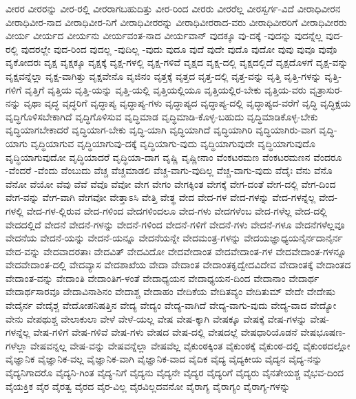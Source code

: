 {ವೀರರ
ವೀರರನ್ನು
ವೀರ-ರಲ್ಲಿ
ವೀರರಾಗಬಹುದಿತ್ತು
ವೀರ-ರಿಂದ
ವೀರರು
ವೀರರೆಲ್ಲ
ವೀರಸ್ವರ್ಗ-ವಿದೆ
ವೀರಾಧಿವೀರನ
ವೀರಾಧಿವೀರ-ನಾದ
ವೀರಾಧಿವೀರ-ನಿಗೆ
ವೀರಾಧಿವೀರರನ್ನು
ವೀರಾಧಿವೀರರಾದ-ವರು
ವೀರಾಧಿವೀರರಿಗೆ
ವೀರಾಧಿವೀರರು
ವೀರ್ಯ
ವೀರ್ಯದ
ವೀರ್ಯನು
ವೀರ್ಯವಂತ-ನಾದ
ವೀರ್ಯವಾನ್
ವುದಕ್ಕೂ
ವು-ದಕ್ಕೆ
-ವುದನ್ನು
ವುದನ್ನೆಲ್ಲ
ವುದ-ರಲ್ಲಿ
ವುದರಲ್ಲೇ
ವುದ-ರಿಂದ
ವುದಲ್ಲ
-ವುದಿಲ್ಲ
-ವುದು
ವುದೂ
ವುದೆ
ವುದೇ
ವುದೊ
ವುದೋ
ವುವು
ವುವೂ
ವುವೊ
ವೃಕೋದರಃ
ವೃಕ್ಷ
ವೃಕ್ಷಕ್ಕೂ
ವೃಕ್ಷಕ್ಕೆ
ವೃಕ್ಷ-ಗಳಲ್ಲಿ
ವೃಕ್ಷ-ಗಳಿವೆ
ವೃಕ್ಷದ
ವೃಕ್ಷ-ದಲ್ಲಿ
ವೃಕ್ಷದಲ್ಲಿದೆ
ವೃಕ್ಷದೊಳಗೆ
ವೃಕ್ಷ-ವನ್ನು
ವೃಕ್ಷವನ್ನೆಲ್ಲಾ
ವೃಕ್ಷ-ವಾಗಿತ್ತು
ವೃಕ್ಷವೇನೊ
ವೃಜಿನಂ
ವೃತ್ತಕ್ಕೆ
ವೃತ್ತದ
ವೃತ್ತ-ದಲ್ಲಿ
ವೃತ್ತ-ವನ್ನು
ವೃತ್ತಿ
ವೃತ್ತಿ-ಗಳನ್ನು
ವೃತ್ತಿ-ಗಳಿಗೆ
ವೃತ್ತಿಗೆ
ವೃತ್ತಿಯ
ವೃತ್ತಿ-ಯನ್ನು
ವೃತ್ತಿ-ಯಲ್ಲಿ
ವೃತ್ತಿಯಲ್ಲಿಯೂ
ವೃತ್ತಿಯಲ್ಲಿರ-ಬೇಕು
ವೃತ್ತಿಯ-ವರು
ವೃತ್ರಾಸುರ-ನನ್ನು
ವೃಥಾ
ವೃದ್ಧ
ವೃದ್ಧರಿಗೆ
ವೃದ್ಧಾಪ್ಯ
ವೃದ್ಧಾಪ್ಯ-ಗಳು
ವೃದ್ಧಾಪ್ಯದ
ವೃದ್ಧಾಪ್ಯ-ದಲ್ಲಿ
ವೃದ್ಧಾಪ್ಯದ-ವರೆಗೆ
ವೃದ್ಧಿ
ವೃದ್ಧಿಕ್ಷಯ
ವೃದ್ಧಿಗೊಳಿಸಬೇಕಾಗಿದೆ
ವೃದ್ಧಿಗೊಳಿಸುವ
ವೃದ್ಧಿಮಾಡ
ವೃದ್ಧಿಮಾಡಿ-ಕೊಳ್ಳ-ಬಹುದು
ವೃದ್ಧಿಮಾಡಿಕೊಳ್ಳ-ಬೇಕು
ವೃದ್ಧಿಯಾಗಬೇಕಾದರೆ
ವೃದ್ಧಿಯಾಗ-ಬೇಕು
ವೃದ್ಧಿ-ಯಾಗಿ
ವೃದ್ಧಿಯಾಗಿದೆ
ವೃದ್ಧಿಯಾಗಿರಿ
ವೃದ್ಧಿಯಾಗಿರು-ವಾಗ
ವೃದ್ಧಿ-ಯಾಗು
ವೃದ್ಧಿಯಾಗುವ
ವೃದ್ಧಿಯಾಗುವು-ದಕ್ಕೆ
ವೃದ್ಧಿಯಾಗು-ವುದು
ವೃದ್ಧಿಯಾಗುವುದೇ
ವೃದ್ಧಿಯಾಗುವುದೊ
ವೃದ್ಧಿಯಾಗುವುದೋ
ವೃದ್ಧಿಯಾದರೆ
ವೃದ್ಧಿಯಾ-ದಾಗ
ವೃಷ್ಣಿ
ವೃಷ್ಣೀನಾಂ
ವೆಂಕಟರಮಣ
ವೆಂಕಟರಮಣನ
ವೆಂದರೂ
-ವೆಂದರೆ
-ವೆಂದು
ವೆಂಬುದು
ವೆಚ್ಚ
ವೆಚ್ಚಮಾಡಲಿ
ವೆಚ್ಚ-ವಾಗು-ವುದಿಲ್ಲ
ವೆಚ್ಚ-ವಾಗು-ವುದು
ವೆದೈಃ
ವೆನು
ವೆನೊ
ವೆನೋ
ವೆಯೋ
ವೆವು
ವೆವೆ
ವೆವೊ
ವೆವೋ
ವೇಗ
ವೇಗಂ
ವೇಗಕ್ಕಿಂತ
ವೇಗಕ್ಕೆ
ವೇಗ-ದಂತೆ
ವೇಗ-ದಲ್ಲಿ
ವೇಗ-ದಿಂದ
ವೇಗ-ವನ್ನು
ವೇಗ-ವಾಗಿ
ವೇಗವೋ
ವೇತ್ತಾಽಸಿ
ವೇತ್ತಿ
ವೇತ್ಥ
ವೇದ
ವೇದ-ಗಳ
ವೇದ-ಗಳನ್ನು
ವೇದ-ಗಳನ್ನೆಲ್ಲ
ವೇದ-ಗಳಲ್ಲಿ
ವೇದ-ಗಳ-ಲ್ಲಿರುವ
ವೇದ-ಗಳಿಂದ
ವೇದಗಳಿಂದಲೂ
ವೇದ-ಗಳು
ವೇದಗಳೆಂಬ
ವೇದ-ಗಳೆಲ್ಲ
ವೇದ-ದಲ್ಲಿ
ವೇದದಲ್ಲಿದೆ
ವೇದನೆ
ವೇದನೆ-ಗಳನ್ನು
ವೇದನೆ-ಗಳಿಂದ
ವೇದನೆ-ಗಳಿಗೆ
ವೇದನೆ-ಗಳು
ವೇದನೆ-ಗಳೂ
ವೇದನೆಗಳೆಲ್ಲವೂ
ವೇದನೆಯ
ವೇದನೆ-ಯನ್ನು
ವೇದನೆ-ಯನ್ನೂ
ವೇದನೆಯನ್ನೇ
ವೇದಮಂತ್ರ-ಗಳನ್ನು
ವೇದಯಜ್ಞಾಧ್ಯಯನೈರ್ನದಾನೈರ್ನ
ವೇದ-ವನ್ನು
ವೇದವಾದರತಾಃ
ವೇದವಿತ್
ವೇದವಿದೋ
ವೇದವೇದಾಂತ
ವೇದವೇದಾಂತ-ಗಳ
ವೇದವೇದಾಂತ-ಗಳನ್ನೂ
ವೇದವೇದಾಂತ-ದಲ್ಲಿ
ವೇದವ್ಯಾಸ
ವೇದಶಾಖೆಯ
ವೇದಾ
ವೇದಾಂತ
ವೇದಾಂತಕೃದ್ವೇದವಿದೇವ
ವೇದಾಂತಕ್ಕೆ
ವೇದಾಂತದ
ವೇದಾಂತ-ವನ್ನು
ವೇದಾಂತಿ
ವೇದಾಂತಿಗ-ಳಂತೆ
ವೇದಾಧ್ಯಯನ
ವೇದಾಧ್ಯಯನ-ದಿಂದ
ವೇದಾನಾಂ
ವೇದಾರ್ಥ
ವೇದಾರ್ಥಸಾರವೂ
ವೇದಾವಿನಾಶಿನಂ
ವೇದಾಶ್ಚ
ವೇದಾಹಂ
ವೇದಿಕೆಯ
ವೇದಿತವ್ಯಂ
ವೇದಿತುಮ್
ವೇದೇ
ವೇದೇಷು
ವೇದೈರ್ನ
ವೇದೈಶ್ಚ
ವೇದೋಪನಿಷತ್ತಿನ
ವೇದ್ಯ
ವೇದ್ಯಂ
ವೇದ್ಯ-ವಾಗಿದೆ
ವೇದ್ಯ-ವಾಗು-ವುದು
ವೇದ್ಯ-ವಾದ
ವೇದ್ಯೋ
ವೇನು
ವೇಪಥುಶ್ಚ
ವೇಲಾಕುಲಾ
ವೇಳೆ
ವೇಳೆ-ಯಲ್ಲ
ವೇಷ
ವೇಷ-ಕ್ಕಾಗಿ
ವೇಷಕ್ಕೂ
ವೇಷಕ್ಕೆ
ವೇಷ-ಗಳನ್ನು
ವೇಷ-ಗಳನ್ನೆಲ್ಲ
ವೇಷ-ಗಳಿಗೆ
ವೇಷ-ಗಳಿವೆ
ವೇಷ-ಗಳು
ವೇಷದ
ವೇಷ-ದಲ್ಲಿ
ವೇಷದಲ್ಲೆ
ವೇಷಧಾರಿಯೊಡನೆ
ವೇಷಭೂಷಣ-ಗಳೆಲ್ಲಾ
ವೇಷವನ್ನಲ್ಲ
ವೇಷ-ವನ್ನು
ವೇಷವನ್ನೆಲ್ಲಾ
ವೇಷವೆಲ್ಲ
ವೈಕುಂಠಕ್ಕಿಂತ
ವೈಕುಂಠಕ್ಕೆ
ವೈಕುಂಠ-ದಲ್ಲಿ
ವೈಕುಂಠದಲ್ಲೋ
ವೈಜ್ಞಾನಿಕ
ವೈಜ್ಞಾನಿಕ-ವಲ್ಲ
ವೈಜ್ಞಾನಿಕ-ವಾಗಿ
ವೈಜ್ಞಾನಿಕ-ವಾದ
ವೈದಿಕ
ವೈದ್ಯ
ವೈದ್ಯಕೀಯ
ವೈದ್ಯನ
ವೈದ್ಯ-ನನ್ನು
ವೈದ್ಯನಿಗಾದರೊ
ವೈದ್ಯನಿ-ಗಿಂತ
ವೈದ್ಯ-ನಿಗೆ
ವೈದ್ಯನು
ವೈದ್ಯನೇ
ವೈದ್ಯರ
ವೈದ್ಯರಿಗೆ
ವೈದ್ಯರು
ವೈನತೇಯಶ್ಚ
ವೈಭವ-ದಿಂದ
ವೈಯಕ್ತಿಕ
ವೈರ
ವೈರತ್ವ
ವೈರದ
ವೈರ-ವಿಲ್ಲ
ವೈರವಿಲ್ಲದವನೋ
ವೈರಾಗ್ಯ
ವೈರಾಗ್ಯಂ
ವೈರಾಗ್ಯ-ಗಳನ್ನು
}
